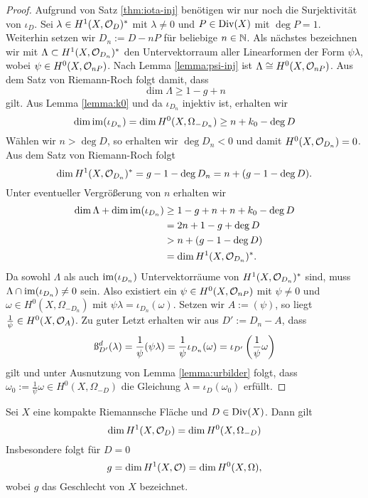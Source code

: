 \begin{proof}
  Aufgrund von Satz \ref{thm:iota-inj} benötigen wir nur noch die
  Surjektivität von $\iota_D$. Sei $\lambda \in H^1(X, \mathcal{O}_D)^\ast$
  mit $\lambda \neq 0$ und $P \in \operatorname{Div}(X)$ mit $\deg P = 1$. Weiterhin
  setzen wir $D_n := D - n P$ für beliebige $n \in \mathbb{N}$. Als nächstes
  bezeichnen wir mit $\Lambda \subset H^1(X, \mathcal{O}_{D_n})^\ast$ den
  Untervektorraum aller Linearformen der Form $\psi \lambda$, wobei
  $\psi \in H^0(X, \mathcal{O}_{nP})$. Nach Lemma \ref{lemma:psi-inj} ist
  $\Lambda \cong H^0(X, \mathcal{O}_{nP})$. Aus dem Satz von Riemann-Roch
  folgt damit, dass
  \[
  \dim \Lambda \geq 1 - g + n
  \]
  gilt. Aus Lemma \ref{lemma:k0} und da $\iota_{D_n}$ injektiv ist,
  erhalten wir
  \[
  \dim \operatorname{im}(\iota_{D_n}) = \dim H^0(X, \Omega_{-D_n}) \geq n + k_0 -
  \deg D
  \]
  Wählen wir $n > \deg D$, so erhalten wir $\deg D_n < 0$ und damit
  $H^0(X, \mathcal{O}_{D_n}) = 0$. Aus dem Satz von Riemann-Roch folgt
  \[
  \dim H^1(X, \mathcal{O}_{D_n})^\ast = g - 1 - \deg D_n = n + ( g - 1 -
  \deg D).
  \]
  Unter eventueller Vergrößerung von $n$ erhalten wir
  \begin{align*}
    \dim \Lambda + \dim \operatorname{im}(\iota_{D_n}) & \geq 1 - g + n + n + k_0 -
    \deg D \\
    & = 2 n + 1 - g + \deg D \\
    & > n + (g - 1 - \deg D) \\
    & = \dim H^1(X, \mathcal{O}_{D_n})^\ast.
  \end{align*}
  Da sowohl $\Lambda$ als auch $\operatorname{im}(\iota_{D_n})$ Untervektorräume von
  $H^1(X, \mathcal{O}_{D_n})^\ast$ sind, muss $\Lambda \cap \operatorname{im}(\iota_{D_n})
  \neq 0$ sein. Also existiert ein $\psi \in H^0(X, \mathcal{O}_{nP})$ mit
  $\psi \neq 0$ und $\omega \in H^0(X, \Omega_{-D_n})$ mit $\psi
  \lambda = \iota_{D_n}(\omega)$. Setzen wir $A := (\psi)$, so liegt
  $\frac{1}{\psi} \in H^0(X, \mathcal{O}_A)$. Zu guter Letzt erhalten wir aus
  $D' := D_n - A$, dass
  \begin{align*}
    \i_{D'}^d(\lambda) = \frac{1}{\psi} (\psi \lambda) =
    \frac{1}{\psi} \iota_{D_n}(\omega) = \iota_{D'} \left (
      \frac{1}{\psi} \omega \right )
  \end{align*}
  gilt und unter Ausnutzung von Lemma \ref{lemma:urbilder} folgt, dass
  $\omega_0 := \frac{1}{\psi} \omega \in H^0(X, \Omega_{-D})$ die
  Gleichung $\lambda = \iota_D(\omega_0)$ erfüllt.
\end{proof}

\begin{cor}
  Sei $X$ eine kompakte Riemannsche Fläche und $D \in \operatorname{Div}(X)$. Dann
  gilt
  \[
  \dim H^1(X, \mathcal{O}_D) = \dim H^0(X, \Omega_{-D})
  \]
  Insbesondere folgt für $D = 0$
  \[
  g = \dim H^1(X, \mathcal{O}) = \dim H^0(X, \Omega),
  \]
  wobei $g$ das Geschlecht von $X$ bezeichnet.
\end{cor}

